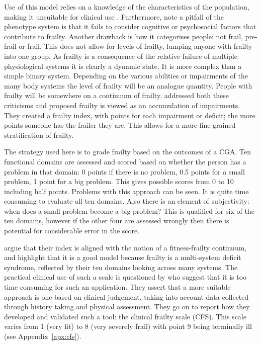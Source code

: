 \documentclass
[
	12pt,
	a4paper,
	oneside,
]{report}
\begin{document}
Use of this model relies on a knowledge of the characteristics of the population,
making it unsuitable for clinical use \parencite{ensrud:08}.
Furthermore, \textcite{martin:08} note a pitfall of the phenotype system is 
that it fails to
consider cognitive or psychosocial factors that contribute to frailty.
Another drawback is how it categorises people: not frail,
pre-frail or frail. This does not allow for levels of frailty, lumping anyone with
frailty into one group. As frailty is a consequence of the relative failure of
multiple physiological systems it is clearly a dynamic state. It is more complex
than a simple binary system. Depending on the various abilities or impairments of
the many body systems the level of frailty will be an analogue quantity. People
with frailty will be somewhere on a continuum of frailty. \textcite{jones:05} 
addressed both these criticisms and proposed frailty is viewed as an accumulation of
impairments. They created a frailty index, with points for each impairment or
deficit; the more points someone has the frailer they are. This allows for a more 
fine grained stratification of frailty.

The strategy used here is to grade frailty based on the outcomes of a CGA. Ten
functional domains are assessed and scored based on whether the person has a
problem in that domain: 0 points if there is no problem, 0.5 points for a small
problem, 1 point for a big problem. This gives possible scores from 0 to 10 
including half points. Problems with this approach can be seen. It is quite
time consuming to evaluate all ten domains. Also there is an element of 
subjectivity: when does a small problem become a big problem? This is qualified
for six of the ten domains, however if the other four are assessed
wrongly then there is potential for considerable error in the score. 

\textcite{jones:05} argue that their index is aligned with the notion of a 
fitness-frailty continuum, and highlight that it is a good model 
because frailty
is a multi-system deficit syndrome, reflected by their ten domains looking
across many systems. The practical clinical use of such a scale is questioned
by \textcite{rockwood:05} who suggest that it is too time consuming for such an
application. They assert that a more suitable approach is one based
on clinical judgement, taking into account data collected through history taking
and physical assessment. They go on to report how they developed and validated
such a tool: the clinical frailty scale (CFS). This scale varies from 1 (very fit)
to 8 (very severely frail) with point 9 being terminally ill 
(see Appendix~\ref{apx:cfs}).
\end{document}
